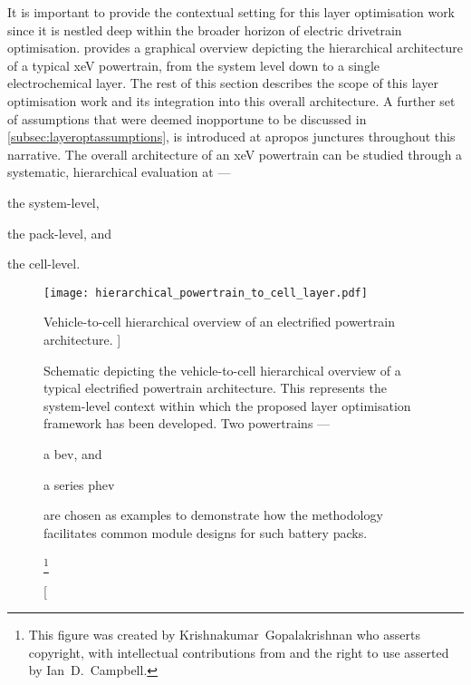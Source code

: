 

It is  important to provide the  contextual setting for this  layer optimisation
work since it is nestled deep  within the broader horizon of electric drivetrain
optimisation.   provides a  graphical overview
depicting the hierarchical architecture of  a typical \gls{xeV} powertrain, from
the  system level  down to  a  single electrochemical  layer. The  rest of  this
section describes the scope of this  layer optimisation work and its integration
into this  overall architecture. A further  set of assumptions that  were deemed
inopportune to be discussed  in \cref{subsec:layeroptassumptions}, is introduced
at apropos junctures  throughout this narrative. The overall  architecture of an
\gls{xeV}  powertrain  can  be  studied through  a  systematic,  hierarchical
evaluation at ---
\begin{enumerate*}[label=\itshape\alph*\upshape)]
    \item the system-level,
    \item the pack-level, and
    \item the cell-level.
\end{enumerate*}

\begin{figure}[!bp]
    \begin{minipage}[t]{\textwidth}
        \centering
        \texttt{[image: hierarchical\_powertrain\_to\_cell\_layer.pdf]}
        \captionsetup{labelsep=note}
        \caption
        [%
        Vehicle-to-cell hierarchical overview of an electrified powertrain architecture.
        ]%
        {%
            Schematic depicting the vehicle-to-cell hierarchical overview of
            a typical electrified powertrain architecture. This represents the
            system-level context within which the proposed layer optimisation framework
            has been developed. Two  powertrains ---
            \begin{enumerate*}[label=\itshape\alph*\upshape)]
                \item a \gls{bev}, and
                \item a series \gls{phev}
            \end{enumerate*}
            are chosen as examples to demonstrate how the methodology facilitates
            common module designs for such battery packs.
        }%
        \label{fig:fig_PowertrainSchematic}
        \mpfootnotes[1]
        \footnote{This figure was created by \mbox{Krishnakumar Gopalakrishnan} who
            asserts copyright, with intellectual contributions from and the right to
        use asserted by \mbox{Ian D.\ Campbell}.}
    \end{minipage}
\end{figure}

